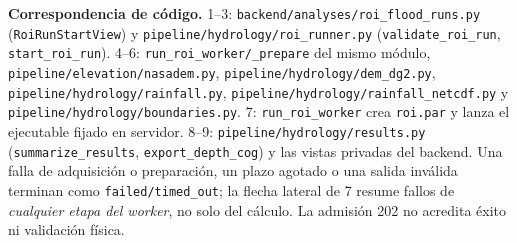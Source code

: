 \documentclass[11pt,a4paper]{article}
\newcommand{\src}[1]{\nolinkurl{#1}}
\begin{document}
\noindent\textbf{Correspondencia de código.} 1--3: \src{backend/analyses/roi_flood_runs.py} (\texttt{RoiRunStartView}) y \src{pipeline/hydrology/roi_runner.py} (\src{validate_roi_run}, \src{start_roi_run}). 4--6: \src{run_roi_worker/_prepare} del mismo módulo, \src{pipeline/elevation/nasadem.py}, \src{pipeline/hydrology/dem_dg2.py}, \src{pipeline/hydrology/rainfall.py}, \src{pipeline/hydrology/rainfall_netcdf.py} y \src{pipeline/hydrology/boundaries.py}. 7: \texttt{run\_roi\_worker} crea \texttt{roi.par} y lanza el ejecutable fijado en servidor. 8--9: \src{pipeline/hydrology/results.py} (\texttt{summarize\_results}, \texttt{export\_depth\_cog}) y las vistas privadas del backend. Una falla de adquisición o preparación, un plazo agotado o una salida inválida terminan como \texttt{failed/timed\_out}; la flecha lateral de 7 resume fallos de \emph{cualquier etapa del worker}, no solo del cálculo. La admisión 202 no acredita éxito ni validación física.

\newpage
\end{document}
